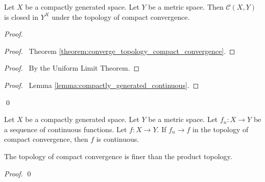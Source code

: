 \begin{theorem}[Choice]
    Let $X$ be a compactly generated space. Let $Y$ be a metric space. Then $\mathcal{C}(X,Y)$ is closed in $Y^X$
    under the topology of compact convergence.
\end{theorem}

\begin{proof}
    \pf
    \begin{proof}
        \pf\ Theorem \ref{theorem:converge_topology_compact_convergence}.
    \end{proof}
    \begin{proof}
        \pf\ By the Uniform Limit Theorem.
    \end{proof}
    \qedstep
    \begin{proof}
        \pf\ Lemma \ref{lemma:compactly_generated_continuous}.
    \end{proof}
    \qed
\end{proof}

\begin{corollary}
    Let $X$ be a compactly generated space. Let $Y$ be a metric space. Let $f_n : X \rightarrow Y$ be a sequence
    of continuous functions. Let $f : X \rightarrow Y$. If $f_n \rightarrow f$ in the topology of compact convergence,
    then $f$ is continuous.
\end{corollary}

\begin{proposition}
    The topology of compact convergence is finer than the product topology.
\end{proposition}

\begin{proof}
    \pf
    \qed
\end{proof}


